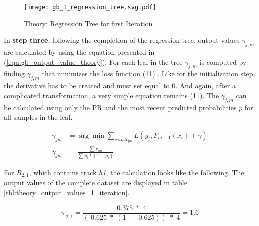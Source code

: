 \begin{figure}[H]
    \centering
    \caption[]{Theory: Regression Tree for first Iteration}
	\label{fig:gb_1_regression_tree}
    \texttt{[image: gb\_1\_regression\_tree.svg.pdf]}
\end{figure}

In \textbf{step three}, following the completion of the regression tree, output values \(\gamma_{j, m}\) are calculated by using 
the equation presented in (\ref{equ:gb_output_value_theory}). For each leaf in the tree \(\gamma_{j, m}\) is computed by finding 
\(\gamma_{j, m}\) that minimizes the loss function (11) \cite[p.361]{Hastie_2009}. Like for the initialization step, the derivative has 
to be created and must set equal to \(0\). And again, after a complicated transformation, a very simple 
equation remains (11). The \(\gamma_{j, m}\)  can be calculated using only the \ac{PR} and the most 
recent predicted probabilities \(p\) for all samples in the leaf. 

\begin{equation}
    \begin{aligned}
        \gamma_{jm} &= \arg \min_{\gamma}\sum_{x_{i} in R_{jm}} L(y_{i},F_{m-1}(x_{i}) + \gamma)
        \\
        \gamma_{jm} &= \frac{ \sum r_{im}}{\sum p_{i} * (1 - p_{i})}
        \label{equ:gb_output_value_theory}
    \end{aligned}
\end{equation}

For \(R_{2,1}\), which contains track \emph{h1}, the calculation looks like the following. The output values of the complete 
dataset are displayed in table \ref{tbl:theory_output_values_1_iteration}. 

\begin{equation*}
\gamma_{\;2,1} = \frac{0.375\;*\;4}{(\:0.625\;*\;(1\;-\;0.625))\;*\;4} = 1.6 
\end{equation*}

